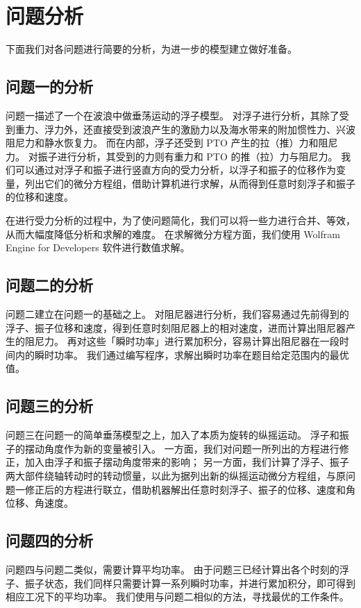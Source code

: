 \section{问题分析}

下面我们对各问题进行简要的分析，为进一步的模型建立做好准备。

\subsection{问题一的分析}

问题一描述了一个在波浪中做垂荡运动的浮子模型。
对浮子进行分析，其除了受到重力、浮力外，还直接受到波浪产生的激励力以及海水带来的附加惯性力、兴波阻尼力和静水恢复力。
而在内部，浮子还受到 PTO 产生的拉（推）力和阻尼力。
对振子进行分析，其受到的力则有重力和 PTO 的推（拉）力与阻尼力。
我们可以通过对浮子和振子进行竖直方向的受力分析，以浮子和振子的位移作为变量，列出它们的微分方程组，借助计算机进行求解，从而得到任意时刻浮子和振子的位移和速度。

在进行受力分析的过程中，为了使问题简化，我们可以将一些力进行合并、等效，从而大幅度降低分析和求解的难度。
在求解微分方程方面，我们使用 Wolfram Engine for Developers 软件进行数值求解。

\subsection{问题二的分析}

问题二建立在问题一的基础之上。
对阻尼器进行分析，我们容易通过先前得到的浮子、振子位移和速度，得到任意时刻阻尼器上的相对速度，进而计算出阻尼器产生的阻尼力。
再对这些「瞬时功率」进行累加积分，容易计算出阻尼器在一段时间内的瞬时功率。
我们通过编写程序，求解出瞬时功率在题目给定范围内的最优值。

\subsection{问题三的分析}

问题三在问题一的简单垂荡模型之上，加入了本质为旋转的纵摇运动。
浮子和振子的摆动角度作为新的变量被引入。
一方面，我们对问题一所列出的方程进行修正，加入由浮子和振子摆动角度带来的影响；
另一方面，我们计算了浮子、振子两大部件绕轴转动时的转动惯量，以此为据列出新的纵摇运动微分方程组，与原问题一修正后的方程进行联立，借助机器解出任意时刻浮子、振子的位移、速度和角位移、角速度。

\subsection{问题四的分析}

问题四与问题二类似，需要计算平均功率。
由于问题三已经计算出各个时刻的浮子、振子状态，我们同样只需要计算一系列瞬时功率，并进行累加积分，即可得到相应工况下的平均功率。
我们使用与问题二相似的方法，寻找最优的工作条件。